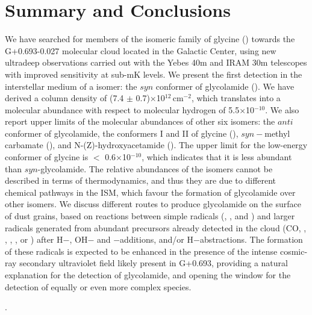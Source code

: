 \documentclass[twocolumn]{aastex63}
\begin{document}
\section{Summary and Conclusions}

We have searched for members of the isomeric family of glycine () towards the G+0.693-0.027 molecular cloud located in the Galactic Center, using new ultradeep observations carried out with the Yebes 40m and IRAM 30m telescopes with improved sensitivity at sub-mK levels. We present the first detection in the interstellar medium of a  isomer: the $syn$ conformer of glycolamide (). 
We have derived a column density of (7.4 $\pm$ 0.7)$\times$10$^{12}$\,cm$^{-2}$, which translates into a molecular abundance with respect to molecular hydrogen of 5.5$\times$10$^{-10}$. 
We also report upper limits of the molecular abundances of other six isomers: the $anti$ conformer of glycolamide, the conformers I and II of glycine (), $syn-$methyl carbamate (), and N-(Z)-hydroxyacetamide (). 
The upper limit for the low-energy conformer of glycine is $<$ 0.6$\times$10$^{-10}$, which indicates that it is less abundant than $syn$-glycolamide. The relative abundances of the  isomers cannot be described in terms of thermodynamics, and thus they are due to different chemical pathways in the ISM, which favour the formation of glycolamide over other isomers.
We discuss different routes to produce glycolamide on the surface of dust grains, based on reactions between simple radicals (, ,  and ) and larger radicals generated from abundant precursors already detected in the cloud (CO, , , , ,  or ) after H$-$, OH$-$ and $-$additions, and/or H$-$abstractions. The formation of these radicals is expected to be enhanced in the presence of the intense cosmic-ray secondary ultraviolet field likely present in G+0.693, providing a natural explanation for the detection of glycolamide, and opening the window for the detection of equally or even more complex species.

.
\end{document}
